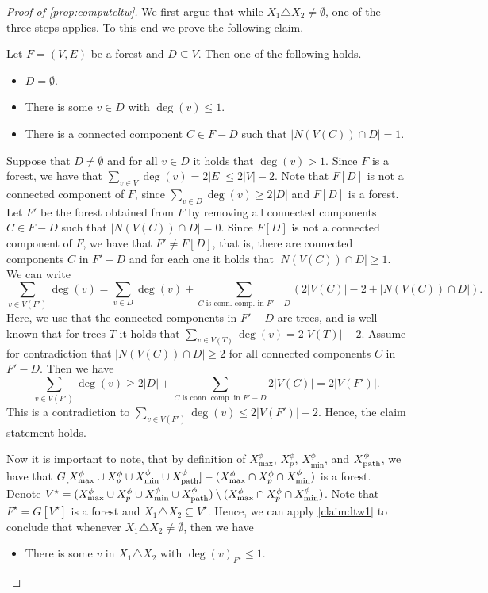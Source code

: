 \documentclass[a4paper,UKenglish,cleveref, autoref, thm-restate, numberwithinsect]{lipics-v2021}
\newcommand{\dpath}{\textup{path}}
\begin{document}
\begin{proof}[Proof of \cref{prop:computeltw}]
We first argue that while $X_1\triangle X_2\neq \emptyset$, one of the three steps applies. 
To this end we prove the following claim.
\begin{claim}\label{claim:ltw1}
Let $F=(V,E)$ be a forest and $D\subseteq V$. Then one of the following holds.
\begin{itemize}
\item $D=\emptyset$.
\item There is some $v\in D$ with $\deg(v)\le 1$.
\item There is a connected component $C\in F-D$ such that $|N(V(C))\cap D|=1$.
\end{itemize}
\begin{claimproof}
Suppose that $D\neq\emptyset$ and for all $v\in D$ it holds that $\deg(v)>1$.
Since $F$ is a forest, we have that $\sum_{v\in V} \deg(v)=2|E|\le 2|V|-2$. 
Note that $F[D]$ is not a connected component of $F$, since $\sum_{v\in D} \deg(v)\ge 2|D|$ and $F[D]$ is a forest.
Let $F'$ be the forest obtained from $F$ by removing all connected components $C\in F-D$ such that $|N(V(C))\cap D|=0$. Since $F[D]$ is not a connected component of $F$, we have that $F'\neq F[D]$, that is, there are connected components $C$ in $F'-D$ and for each one it holds that $|N(V(C))\cap D|\ge 1$.
We can write 
\[\sum_{v\in V(F')} \deg(v)=\sum_{v\in D} \deg(v) + \sum_{C \text{ is conn.\ comp.\ in }F'-D} (2|V(C)|-2 + |N(V(C))\cap D|).
\]
Here, we use that the connected components in $F'-D$ are trees, and is well-known that for trees $T$ it holds that $\sum_{v\in V(T)}\deg(v)=2|V(T)|-2$.
Assume for contradiction that $|N(V(C))\cap D|\ge 2$ for all connected components $C$ in $F'-D$. Then we have
\[\sum_{v\in V(F')} \deg(v)\ge 2|D| + \sum_{C \text{ is conn.\ comp.\ in }F'-D} 2|V(C)|= 2|V(F')|.
\]
This is a contradiction to $\sum_{v\in V(F')} \deg(v)\le 2|V(F')|-2$. Hence, the claim statement holds.
\end{claimproof}
\end{claim}

Now it is important to note, that by definition of $X^\phi_{\max}$, $X^\phi_p$, $X^\phi_{\min}$, and $X^\phi_{\dpath}$, we have that $G[X^\phi_{\max}\cup X^\phi_p\cup X^\phi_{\min}\cup X^\phi_{\dpath}]-(X^\phi_{\max}\cap X^\phi_p\cap X^\phi_{\min})$ is a forest.
Denote $V^\star=(X^\phi_{\max}\cup X^\phi_p\cup X^\phi_{\min}\cup X^\phi_{\dpath})\setminus (X^\phi_{\max}\cap X^\phi_p\cap X^\phi_{\min})$.
Note that $F^\star=G[V^\star]$ is a forest and $X_1\triangle X_2\subseteq V^\star$. 
Hence, we can apply \cref{claim:ltw1} to conclude that whenever $X_1\triangle X_2\neq\emptyset$, then we have 
\begin{itemize}
\item There is some $v$ in $X_1\triangle X_2$ with $\deg(v)_{F^\star}\le 1$. 


\end{itemize}
\end{proof}
\end{document}

